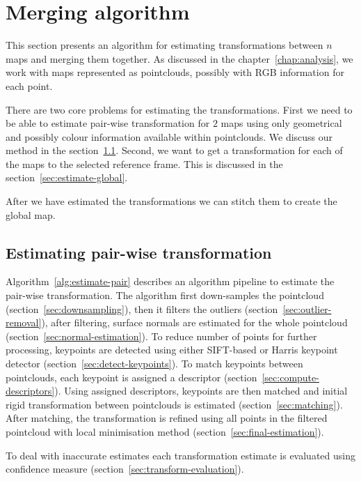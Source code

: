 \chapter{Merging algorithm}
\label{chap:mergingalgorithm}


This section presents an algorithm for estimating transformations between $n$ maps and merging them together. As discussed in the chapter~\ref{chap:analysis}, we work with maps represented as pointclouds, possibly with \gls{RGB} information for each point.

There are two core problems for estimating the transformations. First we need to be able to estimate pair-wise transformation for $2$ maps using only geometrical and possibly colour information available within pointclouds. We discuss our method in the section~\ref{sec:estimate-pair-wise}. Second, we want to get a transformation for each of the maps to the selected reference frame. This is discussed in the section~\ref{sec:estimate-global}.

After we have estimated the transformations we can stitch them to create the global map.

\section{Estimating pair-wise transformation}
\label{sec:estimate-pair-wise}

Algorithm~\ref{alg:estimate-pair} describes an algorithm pipeline to estimate the pair-wise transformation. The algorithm first down-samples the pointcloud (section~\ref{sec:downsampling}), then it filters the outliers (section~\ref{sec:outlier-removal}), after filtering, surface normals are estimated for the whole pointcloud (section~\ref{sec:normal-estimation}). To reduce number of points for further processing, keypoints are detected using either \gls{SIFT}-based or Harris keypoint detector (section~\ref{sec:detect-keypoints}). To match keypoints between pointclouds, each keypoint is assigned a descriptor (section~\ref{sec:compute-descriptors}). Using assigned descriptors, keypoints are then matched and initial rigid transformation between pointclouds is estimated (section~\ref{sec:matching}). After matching, the transformation is refined using all points in the filtered pointcloud with local minimisation method (section~\ref{sec:final-estimation}).

To deal with inaccurate estimates each transformation estimate is evaluated using confidence measure (section~\ref{sec:transform-evaluation}).

